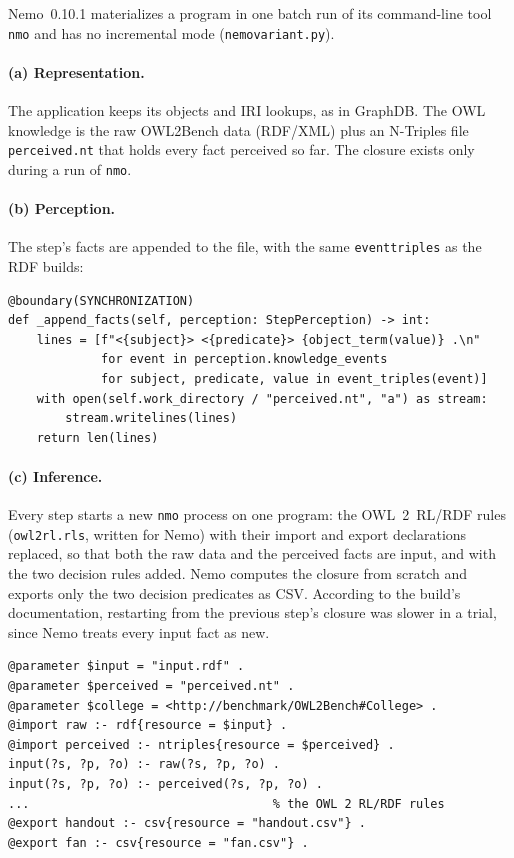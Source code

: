 \documentclass[10pt]{article}
\newcommand{\brkunderscore}{\textunderscore\allowbreak}
\newcommand{\code}[1]{{\let\_\brkunderscore\texttt{#1}}}
\newcommand{\file}[1]{{\let\_\brkunderscore\texttt{#1}}}
\begin{document}
Nemo~0.10.1 materializes a program in one batch run of its command-line tool \code{nmo} and has no incremental mode
(\file{nemo\_variant.py}).

\paragraph{(a) Representation.} The application keeps its objects and IRI lookups, as in GraphDB. The OWL knowledge is
the raw OWL2Bench data (RDF/XML) plus an N-Triples file \file{perceived.nt} that holds every fact perceived so far.
The closure exists only during a run of \code{nmo}.

\paragraph{(b) Perception.} The step's facts are appended to the file, with the same \code{event\_triples} as the RDF
builds:
\begin{lstlisting}[style=py]
@boundary(SYNCHRONIZATION)
def _append_facts(self, perception: StepPerception) -> int:
    lines = [f"<{subject}> <{predicate}> {object_term(value)} .\n"
             for event in perception.knowledge_events
             for subject, predicate, value in event_triples(event)]
    with open(self.work_directory / "perceived.nt", "a") as stream:
        stream.writelines(lines)
    return len(lines)
\end{lstlisting}

\paragraph{(c) Inference.} Every step starts a new \code{nmo} process on one program: the OWL~2~RL/RDF rules
(\file{owl2rl.rls}, written for Nemo) with their import and export declarations replaced, so that both the raw data and
the perceived facts are input, and with the two decision rules added. Nemo computes the closure from scratch and exports
only the two decision predicates as CSV. According to the build's documentation, restarting from the previous step's
closure was slower in a trial, since Nemo treats every input fact as new.
\begin{lstlisting}[style=nm]
@parameter $input = "input.rdf" .
@parameter $perceived = "perceived.nt" .
@parameter $college = <http://benchmark/OWL2Bench#College> .
@import raw :- rdf{resource = $input} .
@import perceived :- ntriples{resource = $perceived} .
input(?s, ?p, ?o) :- raw(?s, ?p, ?o) .
input(?s, ?p, ?o) :- perceived(?s, ?p, ?o) .
...                                  % the OWL 2 RL/RDF rules
@export handout :- csv{resource = "handout.csv"} .
@export fan :- csv{resource = "fan.csv"} .
\end{lstlisting}
\end{document}
